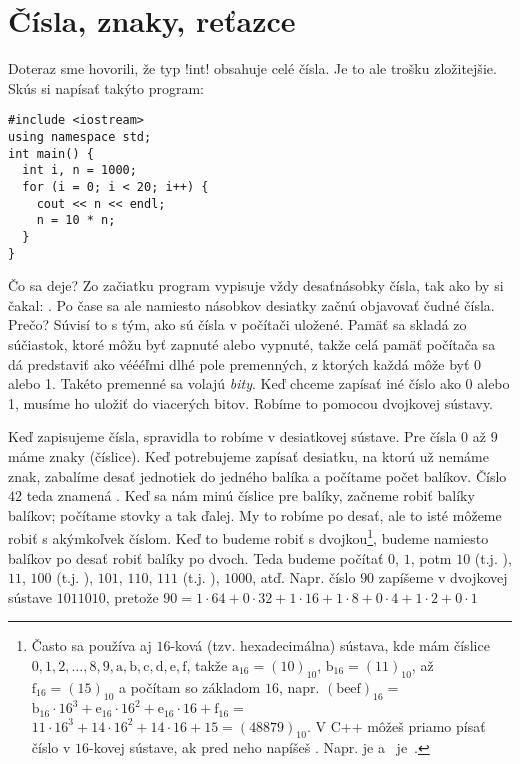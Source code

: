 \chapter{Čísla, znaky, reťazce}
\label{sect:cisla}

Doteraz sme hovorili, že typ \prg!int! obsahuje celé čísla. Je to ale trošku zložitejšie.
Skús si napísať takýto program:\\

\begin{lstlisting}
#include <iostream>
using namespace std;
int main() {
  int i, n = 1000;
  for (i = 0; i < 20; i++) {
    cout << n << endl;
    n = 10 * n;
  }
}
\end{lstlisting}


Čo sa deje? Zo začiatku program vypisuje vždy desaťnásobky čísla, tak ako by si čakal:
. Po čase sa ale namiesto násobkov desiatky začnú objavovať
čudné čísla. Prečo? Súvisí to s tým, ako sú čísla v počítači uložené. Pamäť sa skladá
zo súčiastok, ktoré môžu byť zapnuté alebo vypnuté, takže celá pamäť počítača sa dá predstaviť
ako véééľmi dlhé pole premenných, z ktorých každá môže byť 0 alebo 1. Takéto premenné
sa volajú {\em bity}. Keď chceme zapísať iné číslo ako 0 alebo 1, musíme ho uložiť
do viacerých bitov. Robíme to pomocou dvojkovej sústavy.

Keď zapisujeme čísla, spravidla to robíme v desiatkovej sústave. Pre čísla $0$ až $9$
máme znaky (číslice). Keď potrebujeme zapísať desiatku, na ktorú už nemáme znak, zabalíme
desať jednotiek do jedného balíka a počítame počet balíkov. Číslo $42$ teda znamená 
. Keď sa nám minú číslice pre balíky, začneme
robiť balíky balíkov; počítame stovky a tak ďalej. My to robíme 
po desať, ale to isté môžeme robiť s akýmkoľvek číslom. Keď to budeme robiť s dvojkou\footnote{\label{foot:hexa}%
Často sa používa aj $16$-ková (tzv. hexadecimálna) sústava, kde mám číslice $0,1,2,\ldots,8,9,\mathrm{a,b,c,d,e,f}$, 
takže  \hbox{$\mathrm a_{16}=(10)_{10}$,} \hbox{$\mathrm b_{16}=(11)_{10}$,} \hbox{až $\mathrm f_{16}=(15)_{10}$}
a počítam so základom $16$, napr. $(\mathrm{beef})_{16}=$
\hbox{$\mathrm b_{16}\cdot 16^3+\mathrm e_{16}\cdot16^2+\mathrm e_{16}\cdot16+\mathrm f_{16}=$}
$11\cdot16^3+14\cdot16^2+14\cdot16+15=(48879)_{10}$.
V C++ môžeš priamo písať číslo v $16$-kovej sústave, ak pred neho napíšeš . Napr. 
 je  a \hbox{ je }.
},
budeme namiesto balíkov po desať robiť balíky po dvoch. Teda budeme počítať $0$, $1$,
potm $10$ (t.j. ), $11$, $100$ (t.j. 
), $101$, $110$, $111$ (t.j.
), $1000$, atď.
Napr. číslo $90$ zapíšeme v dvojkovej sústave $1011010$, pretože
$90=1\cdot64+0\cdot32+1\cdot16+1\cdot8+0\cdot4+1\cdot2+0\cdot1$\\

